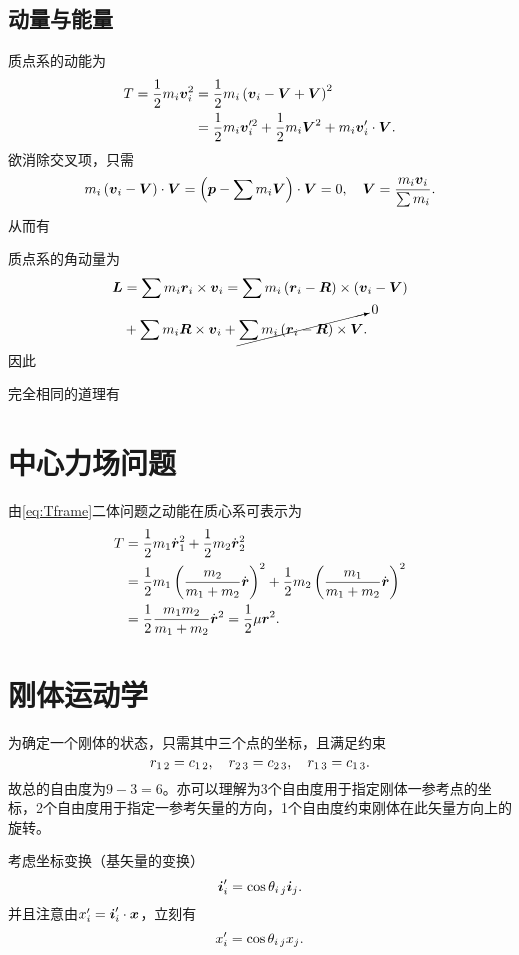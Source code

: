 \documentclass{ctexart}
\begin{document}
\subsection{动量与能量}
质点系的动能为
\begin{align*}
T = \frac{1}{2} m_i \boldsymbol{v}_i^2 &= \frac{1}{2} m_i\left(\boldsymbol{v}_i-\boldsymbol{V}+\boldsymbol{V}\right)^2\\
&= \frac{1}{2} m_i\boldsymbol{v}'^2_i + \frac{1}{2} m_i\boldsymbol{V}^2 + m_i\boldsymbol{v}'_i\cdot\boldsymbol{V}.
\end{align*}
欲消除交叉项，只需
\[ m_i\left(\boldsymbol{v}_i-\boldsymbol{V}\right)\cdot\boldsymbol{V}=\left(\boldsymbol{p}-\sum m_i\boldsymbol{V}\right)\cdot\boldsymbol{V}=0, \quad \boldsymbol{V} = \frac{m_i\boldsymbol{v}_i}{\sum m_i}. \]
从而有
\par
质点系的角动量为
\begin{align*}
\boldsymbol{L} &= \sum m_i\boldsymbol{r}_i\times\boldsymbol{v}_i = \sum m_i \left(\boldsymbol{r}_i - \boldsymbol{R}\right) \times \left(\boldsymbol{v}_i - \boldsymbol{V}\right) \\
&+ \sum m_i \boldsymbol{R} \times \boldsymbol{v}_i + \cancelto{0}{\sum m_i \left(\boldsymbol{r}_i-\boldsymbol{R}\right) \times \boldsymbol{V}}.
\end{align*}
因此
\par
完全相同的道理有


\section{中心力场问题}
由\eqref{eq:Tframe}二体问题之动能在质心系可表示为
\begin{align*}
T &= \frac{1}{2} m_1\dot{\boldsymbol{r}}_1^2+\frac{1}{2} m_2\dot{\boldsymbol{r}}_2^2 \\
&= \frac{1}{2} m_1\left(\frac{m_2}{m_1+m_2}\dot{\boldsymbol{r}}\right)^2 + \frac{1}{2} m_2\left(\frac{m_1}{m_1+m_2}\dot{\boldsymbol{r}}\right)^2 \\
&= \frac{1}{2}\frac{m_1m_2}{m_1+m_2}\dot{\boldsymbol{r}}^2 = \frac{1}{2}\mu\boldsymbol{r}^2.
\end{align*}

\section{刚体运动学}
为确定一个刚体的状态，只需其中三个点的坐标，且满足约束
\[ r_{1 \, 2} = c_{1 \, 2}, \quad r_{2 \, 3} = c_{2 \, 3}, \quad r_{1 \, 3} = c_{1 \, 3}. \]
故总的自由度为$9-3=6$。亦可以理解为3个自由度用于指定刚体一参考点的坐标，2个自由度用于指定一参考矢量的方向，1个自由度约束刚体在此矢量方向上的旋转。
\par
考虑坐标变换（基矢量的变换）
\[ \boldsymbol{i}'_i = \cos \theta_{i \, j}\boldsymbol{i}_j. \]
并且注意由$x'_i = \boldsymbol{i}'_i\cdot \boldsymbol{x}$，立刻有
\[ x'_i = \cos \theta_{i \, j} x_j. \]
\end{document}
